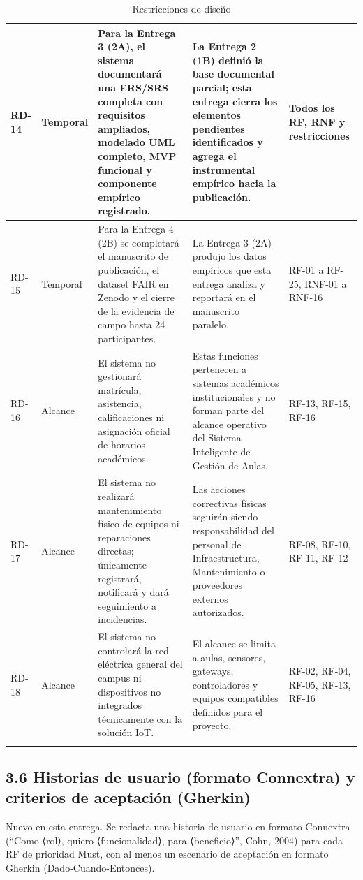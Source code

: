 \begin{longtable}{|P{0.2000}|P{0.2000}|P{0.2000}|P{0.2000}|P{0.2000}|}
RD-14 & Temporal & Para la Entrega 3 (2A), el sistema documentará una ERS/SRS completa con requisitos ampliados, modelado UML completo, MVP funcional y componente empírico registrado. & La Entrega 2 (1B) definió la base documental parcial; esta entrega cierra los elementos pendientes identificados y agrega el instrumental empírico hacia la publicación. & Todos los RF, RNF y restricciones \\ \hline
RD-15 & Temporal & Para la Entrega 4 (2B) se completará el manuscrito de publicación, el dataset FAIR en Zenodo y el cierre de la evidencia de campo hasta 24 participantes. & La Entrega 3 (2A) produjo los datos empíricos que esta entrega analiza y reportará en el manuscrito paralelo. & RF-01 a RF-25, RNF-01 a RNF-16 \\ \hline
RD-16 & Alcance & El sistema no gestionará matrícula, asistencia, calificaciones ni asignación oficial de horarios académicos. & Estas funciones pertenecen a sistemas académicos institucionales y no forman parte del alcance operativo del Sistema Inteligente de Gestión de Aulas. & RF-13, RF-15, RF-16 \\ \hline
RD-17 & Alcance & El sistema no realizará mantenimiento físico de equipos ni reparaciones directas; únicamente registrará, notificará y dará seguimiento a incidencias. & Las acciones correctivas físicas seguirán siendo responsabilidad del personal de Infraestructura, Mantenimiento o proveedores externos autorizados. & RF-08, RF-10, RF-11, RF-12 \\ \hline
RD-18 & Alcance & El sistema no controlará la red eléctrica general del campus ni dispositivos no integrados técnicamente con la solución IoT. & El alcance se limita a aulas, sensores, gateways, controladores y equipos compatibles definidos para el proyecto. & RF-02, RF-04, RF-05, RF-13, RF-16 \\ \hline
\caption{Restricciones de diseño}
\end{longtable}
\endgroup

\subsection*{3.6 Historias de usuario (formato Connextra) y criterios de aceptación (Gherkin)}


Nuevo en esta entrega. Se redacta una historia de usuario en formato Connextra (``Como ⟨rol⟩, quiero ⟨funcionalidad⟩, para ⟨beneficio⟩'', Cohn, 2004) para cada RF de prioridad Must, con al menos un escenario de aceptación en formato Gherkin (Dado-Cuando-Entonces).


